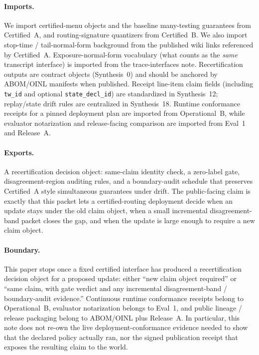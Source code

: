 \documentclass[11pt]{article}
\begin{document}
\paragraph{Imports.}
We import certified-menu objects and the baseline many-testing guarantees from Certified~A, and routing-signature quantizers from Certified~B.\cite{series:menus,series:sigcomp}
We also import stop-time / tail-normal-form background from the published wiki links referenced by Certified~A.
Exposure-normal-form vocabulary (what counts as the \emph{same} transcript interface) is imported from the trace-interfaces note.\cite{series:traceifaces}
Recertification outputs are contract objects (Synthesis~0) and should be anchored by ABOM/OINL manifests when published.\cite{series:contractobjects,series:abomoinl}
Receipt line-item claim fields (including \texttt{tw\_id} and optional \texttt{state\_decl\_id}) are standardized in Synthesis~12; replay/state drift rules are centralized in Synthesis~18.\cite{series:receiptitems,series:planstateequiv}
Runtime conformance receipts for a pinned deployment plan are imported from Operational~B, while evaluator notarization and release-facing comparison are imported from Eval~1 and Release~A.\cite{series:operationalB,series:eval1,series:releaseA}

\paragraph{Exports.}
A recertification decision object: same-claim identity check, a zero-label gate, disagreement-region auditing rules, and a boundary-audit schedule that preserves Certified~A style simultaneous guarantees under drift. The public-facing claim is exactly that this packet lets a certified-routing deployment decide when an update stays under the old claim object, when a small incremental disagreement-band packet closes the gap, and when the update is large enough to require a new claim object.

\paragraph{Boundary.}
This paper stops once a fixed certified interface has produced a recertification decision object for a proposed update: either ``new claim object required'' or ``same claim, with gate verdict and any incremental disagreement-band / boundary-audit evidence.'' Continuous runtime conformance receipts belong to Operational~B, evaluator notarization belongs to Eval~1, and public lineage / release packaging belong to ABOM/OINL plus Release~A.\cite{series:operationalB,series:eval1,series:releaseA} In particular, this note does not re-own the live deployment-conformance evidence needed to show that the declared policy actually ran, nor the signed publication receipt that exposes the resulting claim to the world.
\end{document}
